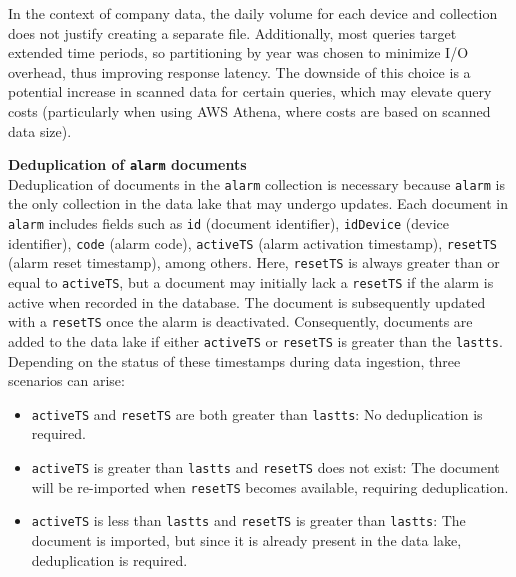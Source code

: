 In the context of company data, the daily volume for each device and collection does not justify creating a separate file. Additionally, most queries target extended time periods, so partitioning by year was chosen to minimize I/O overhead, thus improving response latency. The downside of this choice is a potential increase in scanned data for certain queries, which may elevate query costs (particularly when using AWS Athena, where costs are based on scanned data size).

\textbf{Deduplication of \texttt{alarm} documents} \\
Deduplication of documents in the \texttt{alarm} collection is necessary because \texttt{alarm} is the only collection in the data lake that may undergo updates. Each document in \texttt{alarm} includes fields such as \texttt{id} (document identifier), \texttt{idDevice} (device identifier), \texttt{code} (alarm code), \texttt{activeTS} (alarm activation timestamp), \texttt{resetTS} (alarm reset timestamp), among others. Here, \texttt{resetTS} is always greater than or equal to \texttt{activeTS}, but a document may initially lack a \texttt{resetTS} if the alarm is active when recorded in the database. The document is subsequently updated with a \texttt{resetTS} once the alarm is deactivated. Consequently, documents are added to the data lake if either \texttt{activeTS} or \texttt{resetTS} is greater than the \texttt{lastts}. Depending on the status of these timestamps during data ingestion, three scenarios can arise:

\begin{itemize}
    \item \texttt{activeTS} and \texttt{resetTS} are both greater than \texttt{lastts}: No deduplication is required.
    \item \texttt{activeTS} is greater than \texttt{lastts} and \texttt{resetTS} does not exist: The document will be re-imported when \texttt{resetTS} becomes available, requiring deduplication.
    \item \texttt{activeTS} is less than \texttt{lastts} and \texttt{resetTS} is greater than \texttt{lastts}: The document is imported, but since it is already present in the data lake, deduplication is required.
\end{itemize}


